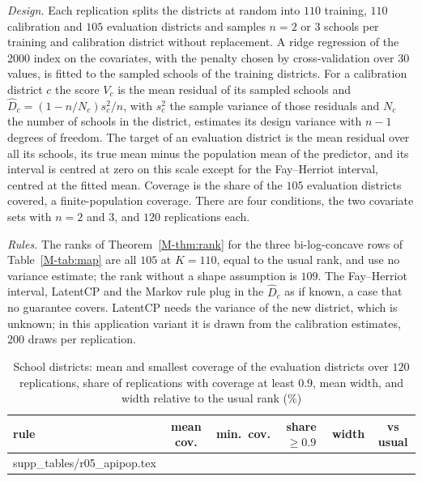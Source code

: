 \documentclass[12pt]{article}
\makeatletter
\newcommand{\tabinput}[1]{\@@input #1 }
\renewcommand{\_}{\usc\allowbreak}
\theoremstyle{definition}
\numberwithin{equation}{section}
\makeatother
\begin{document}
\emph{Design.} Each replication splits the districts at random into $110$ training, $110$ calibration and $105$ evaluation districts and samples $n = 2$ or $3$ schools per training and calibration district without replacement. A ridge regression of the 2000 index on the covariates, with the penalty chosen by cross-validation over $30$ values, is fitted to the sampled schools of the training districts. For a calibration district $c$ the score $V_c$ is the mean residual of its sampled schools and $\hat D_c = (1 - n/N_c)s_c^2/n$, with $s_c^2$ the sample variance of those residuals and $N_c$ the number of schools in the district, estimates its design variance with $n - 1$ degrees of freedom. The target of an evaluation district is the mean residual over all its schools, its true mean minus the population mean of the predictor, and its interval is centred at zero on this scale except for the Fay--Herriot interval, centred at the fitted mean. Coverage is the share of the $105$ evaluation districts covered, a finite-population coverage. There are four conditions, the two covariate sets with $n = 2$ and $3$, and $120$ replications each.

\emph{Rules.} The ranks of Theorem~\ref{M-thm:rank} for the three bi-log-concave rows of Table~\ref{M-tab:map} are all $105$ at $K = 110$, equal to the usual rank, and use no variance estimate; the rank without a shape assumption is $109$. The Fay--Herriot interval, LatentCP and the Markov rule plug in the $\hat D_c$ as if known, a case that no guarantee covers. LatentCP needs the variance of the new district, which is unknown; in this application variant it is drawn from the calibration estimates, $200$ draws per replication.

\begin{table}[htbp]
\renewcommand{\baselinestretch}{1}
\caption{School districts: mean and smallest coverage of the evaluation districts over $120$ replications, share of replications with coverage at least $0.9$, mean width, and width relative to the usual rank (\%)}
\label{tab:s-app}
\centering
\fontsize{9}{11pt}\selectfont
\begin{tabular}{lccccc}
\toprule
rule & mean cov. & min.\ cov. & share $\ge 0.9$ & width & vs usual \\
\midrule
\tabinput{supp_tables/r05_apipop.tex}
\bottomrule
\end{tabular}
\end{table}
\end{document}
